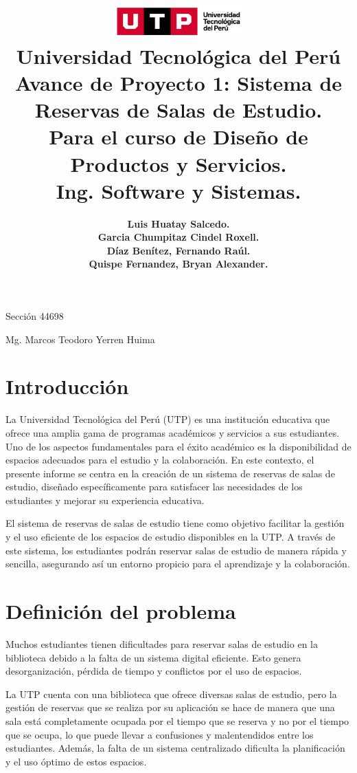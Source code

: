 \documentclass{article}
\title{
  \includegraphics[width=5cm]{./assets/logo-utp.png} \\
  \vspace{1cm}
  \textbf{Universidad Tecnológica del Perú} \\
  \vspace{2cm}
  \textbf{Avance de Proyecto 1: Sistema de Reservas de Salas de Estudio.} \\
  \vspace{1cm}
  \large \textbf{Para el curso de Diseño de Productos y Servicios.} \\
  \large \textbf{Ing. Software y Sistemas.}
}
\author{
  \textbf{Luis Huatay Salcedo.} \\
  \textbf{Garcia Chumpitaz Cindel Roxell.} \\
  \textbf{Díaz Benítez, Fernando Raúl.} \\
  \textbf{Quispe Fernandez, Bryan Alexander.}
}
\begin{document}
\maketitle
\begin{center}
  Sección 44698
\end{center}
\thispagestyle{empty}
\begin{center}
  Mg. Marcos Teodoro Yerren Huima  
\end{center}
\restoregeometry

\newpage

\tableofcontents
\newpage

\vspace*{\fill}
\section{Introducción}
La Universidad Tecnológica del Perú (UTP) es una institución educativa que ofrece una amplia gama de programas académicos y servicios a sus estudiantes. Uno de los aspectos fundamentales para el éxito académico es la disponibilidad de espacios adecuados para el estudio y la colaboración. En este contexto, el presente informe se centra en la creación de un sistema de reservas de salas de estudio, diseñado específicamente para satisfacer las necesidades de los estudiantes y mejorar su experiencia educativa.

El sistema de reservas de salas de estudio tiene como objetivo facilitar la gestión y el uso eficiente de los espacios de estudio disponibles en la UTP. A través de este sistema, los estudiantes podrán reservar salas de estudio de manera rápida y sencilla, asegurando así un entorno propicio para el aprendizaje y la colaboración.
\vspace*{\fill}

\newpage

\section{Definición del problema}

Muchos estudiantes tienen dificultades para reservar salas de estudio en la biblioteca 
debido a la falta de un sistema digital eficiente. Esto genera desorganización, pérdida de tiempo y conflictos por el uso de espacios.

La UTP cuenta con una biblioteca que ofrece diversas salas de estudio, pero la gestión de reservas que se realiza por su aplicación se hace de manera que una sala está completamente ocupada por el tiempo que se reserva y no por el tiempo que se ocupa, lo que puede llevar a confusiones y malentendidos entre los estudiantes. Además, la falta de un sistema centralizado dificulta la planificación y el uso óptimo de estos espacios.
\end{document}
